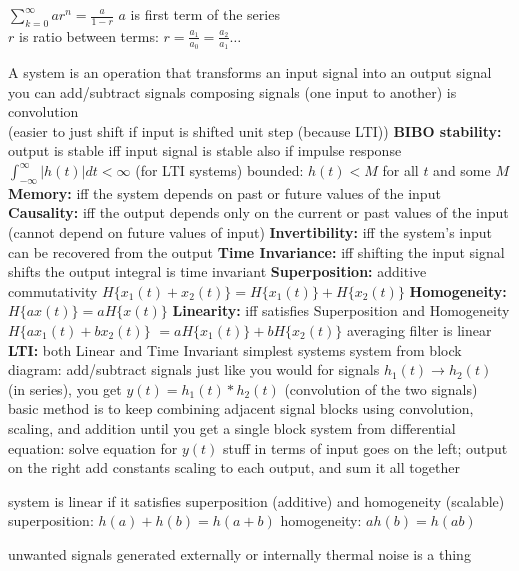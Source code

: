 \documentclass[12pt]{article}
\begin{document}
\begin{multicols*}{2}
\begin{flushleft}
\begin{outline}[longenum]
  \1 $\sum_{k=0}^{\infty} ar^n = \frac{a}{1-r}$
  \1 $a$ is first term of the series
    \\ $r$ is ratio between terms: $r = \frac{a_1}{a_0} = \frac{a_2}{a_1} \ldots$

  \1 A system is an operation that transforms an input signal into an output signal
    \2 you can add/subtract signals
    \2 composing signals (one input to another) is convolution
      \\ (easier to just shift if input is shifted unit step (because LTI))
  \1 \textbf{BIBO stability:} output is stable iff input signal is stable
    \2 also if impulse response $\int_{-\infty}^{\infty} |h(t)| dt < \infty$ (for LTI systems)
    \2 bounded: $h(t)<M$ for all $t$ and some $M$
  \1 \textbf{Memory:} iff the system depends on past or future values of the input
  \1 \textbf{Causality:} iff the output depends only on the current or past values of the input
    \2 (cannot depend on future values of input)
  \1 \textbf{Invertibility:} iff the system's input can be recovered from the output
  \1 \textbf{Time Invariance:} iff shifting the input signal shifts the output
    \2 integral is time invariant
  \1 \textbf{Superposition:} additive commutativity
    \2 $H\{x_1(t)+x_2(t)\} = H\{x_1(t)\}+H\{x_2(t)\}$
  \1 \textbf{Homogeneity:}
    \2 $H\{a x(t)\} = a H\{x(t)\}$
  \1 \textbf{Linearity:} iff satisfies Superposition and Homogeneity
    \2 $H\{a x_1(t)+b x_2(t)\}$ $= a H\{x_1(t)\}+b H\{x_2(t)\}$
    \2 averaging filter is linear
  \1 \textbf{LTI:} both Linear and Time Invariant
    \2 simplest systems
  \1 system from block diagram:
    \2 add/subtract signals just like you would
    \2 for signals $h_1(t) \rightarrow h_2(t)$ (in series), you get $y(t) = h_1(t)*h_2(t)$ (convolution of the two signals)
    \2 basic method is to keep combining adjacent signal blocks using convolution, scaling, and addition until you get a single block
  \1 system from differential equation:
    \2 solve equation for $y(t)$
    \2 stuff in terms of input goes on the left; output on the right
    \2 add constants scaling to each output, and sum it all together

  \1 system is linear if it satisfies superposition (additive) and homogeneity (scalable)
    \2 superposition: $h(a) + h(b) = h(a + b)$
    \2 homogeneity: $a h(b) = h(a b)$

  \1 unwanted signals generated externally or internally
  \1 thermal noise is a thing


\end{outline}
\end{flushleft}
\end{multicols*}
\end{document}
